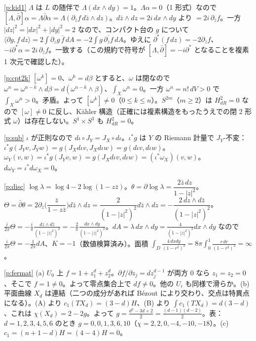 \begin{sol}{\ref{p:kid1}}
$\Lambda$ は $L$ の随伴で $\Lambda(dx\wedge dy)=1$。$\Lambda\alpha=0$（1 形式）なので $[\Lambda,\bar\partial]\alpha=\Lambda\bar\partial\alpha=\Lambda(\partial_{\bar z}f\,d\bar z\wedge dz)$。$d\bar z\wedge dz=2i\,dx\wedge dy$ より $=2i\,\partial_{\bar z}f$。一方 $|dz|^2=|dx|^2+|dy|^2=2$ なので、コンパクト台の $g$ について $\langle\partial g,f\,dz\rangle=2\int\partial_zg\,\bar f\,dA=-2\int g\,\overline{\partial_{\bar z}f}\,dA$。ゆえに $\partial^*(f\,dz)=-2\partial_{\bar z}f$、$-i\partial^*\alpha=2i\,\partial_{\bar z}f$。一致する（この規約で符号が $[\Lambda,\bar\partial]=-i\partial^*$ となることを複素 1 次元で確認した）。
\end{sol}
\begin{sol}{\ref{p:cpt2k}}
$[\omega^k]=0$、$\omega^k=d\beta$ とすると、$\omega$ は閉なので $\omega^n=\omega^{n-k}\wedge d\beta=d(\omega^{n-k}\wedge\beta)$、$\int_X\omega^n=0$。一方 $\omega^n=n!\,dV>0$ で $\int_X\omega^n>0$。矛盾。よって $[\omega^k]\ne0$（$0\le k\le n$）。$S^{2m}$（$m\ge2$）は $H^2_{dR}=0$ なので $[\omega]\ne0$ に反し、Kähler 構造（正確には複素構造をもったうえでの閉 2 形式 $\omega$）は存在しない。$S^1\times S^3$ も $H^2_{dR}=0$。
\end{sol}
\begin{sol}{\ref{p:sub}}
$\iota$ が正則なので $d\iota\circ J_Y=J_X\circ d\iota$。$\iota^*g$ は $Y$ の Riemann 計量で $J_Y$-不変：$\iota^*g(J_Yv,J_Yw)=g(J_Xd\iota v,J_Xd\iota w)=g(d\iota v,d\iota w)$。$\omega_Y(v,w)=\iota^*g(J_Yv,w)=g(J_Xd\iota v,d\iota w)=(\iota^*\omega_X)(v,w)$。$d\omega_Y=\iota^*d\omega_X=0$。
\end{sol}
\begin{sol}{\ref{p:disc}}
$\log\lambda=\log4-2\log(1-z\bar z)$。$\theta=\partial\log\lambda=\dfrac{2\bar z\,dz}{1-|z|^2}$。$\Theta=\bar\partial\theta=2\partial_{\bar z}\Big(\dfrac{\bar z}{1-z\bar z}\Big)d\bar z\wedge dz=\dfrac{2}{(1-|z|^2)^2}d\bar z\wedge dz=-\dfrac{2\,dz\wedge d\bar z}{(1-|z|^2)^2}$。$\frac i{2\pi}\Theta=-\frac i\pi\frac{dz\wedge d\bar z}{(1-|z|^2)^2}=-\frac2\pi\frac{dx\wedge dy}{(1-|z|^2)^2}$。$dA=\lambda\,dx\wedge dy=\frac4{(1-|z|^2)^2}dx\wedge dy$ なので $\frac i{2\pi}\Theta=-\frac1{2\pi}dA$、$K=-1$（数値検算済み）。面積 $\int_D\frac{4\,dxdy}{(1-r^2)^2}=8\pi\int_0^1\frac{r\,dr}{(1-r^2)^2}=\infty$。
\end{sol}
\begin{sol}{\ref{p:fermat}}
(a) $U_0$ 上 $f=1+z_1^d+z_2^d$。$\partial f/\partial z_j=dz_j^{d-1}$ が両方 $0$ なら $z_1=z_2=0$、そこで $f=1\ne0$。よって零点集合上で $df\ne0$。他の $U_i$ も同様で滑らか。(b) 平面曲線 $X_d$ は連結（二つの成分があれば Bézout により交わり、交点は特異点になる）。(A) より $c_1(TX_d)=(3-d)H$、(B) より $\int c_1(TX_d)=d(3-d)$、これは $\chi(X_d)=2-2g$。よって $g=\frac{d^2-3d+2}2=\frac{(d-1)(d-2)}2$。表：$d=1,2,3,4,5,6$ のとき $g=0,0,1,3,6,10$（$\chi=2,2,0,-4,-10,-18$）。(c) $c_1=(n+1-d)H=(4-4)H=0$。
\end{sol}
